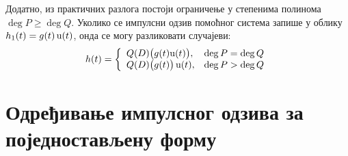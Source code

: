 \vspace*{2mm}
Додатно, из практичних 
разлога постоји ограничење у степенима
полинома $\deg P \geq \deg Q$.  
Уколико се импулсни одзив помоћног система запише 
у облику $h_1(t) = g(t)\,{\rm u}(t)$, онда се
могу разликовати случајеви:
\begin{equation}
h(t) = 
\left\{
\begin{array}{ll}
Q(D)\bigl( g(t){\rm u}(t) \bigr), & \deg P = \deg Q \\
Q(D)\bigl( g(t)\bigr)\, {\rm u}(t) , & \deg P > \deg Q \\
\end{array}
\right.
\end{equation}


\section*{Одређивање импулсног одзива за
поједностављену форму}

